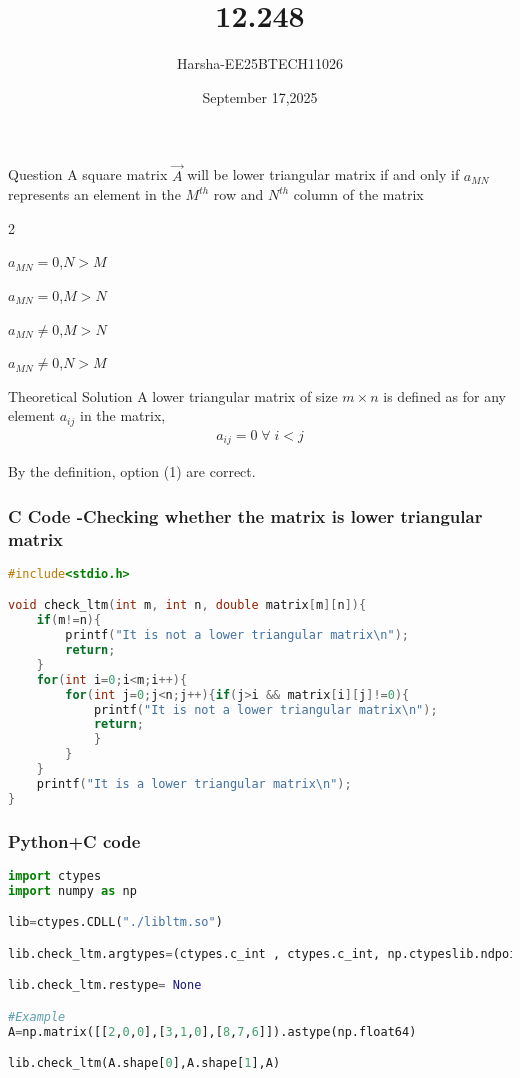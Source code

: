\documentclass{beamer}
\title %
{12.248}
\date{September 17,2025}
\author %
{Harsha-EE25BTECH11026}
\begin{document}
\frame{\titlepage}


\begin{frame}{Question}
A square matrix $\vec{A}$ will be lower triangular matrix if and only if $a_{MN}$ represents an element in the $M^{th}$ row and $N^{th}$ column of the matrix
\begin{enumerate}
\begin{multicols}{2}
    \item $a_{MN}=0$,$N>M$
    \item $a_{MN}=0$,$M>N$
    \item $a_{MN} \neq 0$,$M>N$
    \item $a_{MN} \neq 0$,$N>M$
\end{multicols}
\end{enumerate}
\end{frame}

\begin{frame}{Theoretical Solution}
A lower triangular matrix of size $m\times n$ is defined as for any element $a_{ij}$ in the matrix, 
\begin{align}
    a_{ij}=0 \;\forall\;i<j
\end{align}

By the definition, option (1) are correct.
\end{frame}

\begin{frame}[fragile]
    \frametitle{C Code -Checking whether the matrix is lower triangular matrix}

    \begin{lstlisting}[language=C]
#include<stdio.h>

void check_ltm(int m, int n, double matrix[m][n]){
	if(m!=n){
		printf("It is not a lower triangular matrix\n");
		return;
	}
	for(int i=0;i<m;i++){
		for(int j=0;j<n;j++){if(j>i && matrix[i][j]!=0){
			printf("It is not a lower triangular matrix\n");
			return;
			}
		}
	}
	printf("It is a lower triangular matrix\n");
}
    \end{lstlisting}
\end{frame}


\begin{frame}[fragile]
    \frametitle{Python+C code}

    \begin{lstlisting}[language=Python]
import ctypes 
import numpy as np

lib=ctypes.CDLL("./libltm.so")

lib.check_ltm.argtypes=(ctypes.c_int , ctypes.c_int, np.ctypeslib.ndpointer(dtype=np.float64, ndim=2 , flags="C_CONTIGUOUS"))

lib.check_ltm.restype= None

#Example
A=np.matrix([[2,0,0],[3,1,0],[8,7,6]]).astype(np.float64)

lib.check_ltm(A.shape[0],A.shape[1],A)
    \end{lstlisting}
\end{frame}
\end{document}
